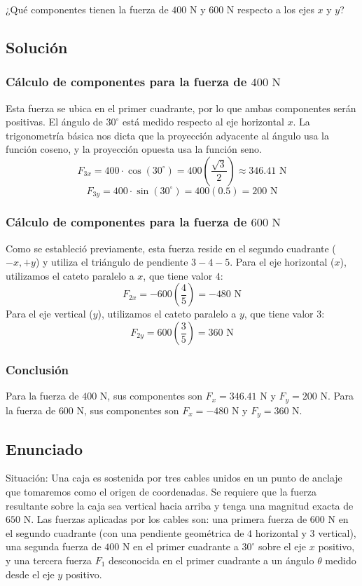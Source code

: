 \documentclass[12pt, a4paper]{article}
\begin{document}
¿Qué componentes tienen la fuerza de $400 \text{ N}$ y $600 \text{ N}$ respecto a los ejes $x$ y $y$?

\subsection*{Solución}

\subsubsection*{Cálculo de componentes para la fuerza de $400 \text{ N}$}
Esta fuerza se ubica en el primer cuadrante, por lo que ambas componentes serán positivas. El ángulo de $30^\circ$ está medido respecto al eje horizontal $x$. La trigonometría básica nos dicta que la proyección adyacente al ángulo usa la función coseno, y la proyección opuesta usa la función seno.
$$F_{3x} = 400 \cdot \cos(30^\circ) = 400 \left(\frac{\sqrt{3}}{2}\right) \approx 346.41 \text{ N}$$
$$F_{3y} = 400 \cdot \sin(30^\circ) = 400 (0.5) = 200 \text{ N}$$

\subsubsection*{Cálculo de componentes para la fuerza de $600 \text{ N}$}
Como se estableció previamente, esta fuerza reside en el segundo cuadrante ($-x, +y$) y utiliza el triángulo de pendiente $3-4-5$. 
Para el eje horizontal ($x$), utilizamos el cateto paralelo a $x$, que tiene valor $4$:
$$F_{2x} = -600 \left(\frac{4}{5}\right) = -480 \text{ N}$$
Para el eje vertical ($y$), utilizamos el cateto paralelo a $y$, que tiene valor $3$:
$$F_{2y} = 600 \left(\frac{3}{5}\right) = 360 \text{ N}$$

\subsubsection*{Conclusión}
Para la fuerza de $400 \text{ N}$, sus componentes son $F_x = 346.41 \text{ N}$ y $F_y = 200 \text{ N}$. 
Para la fuerza de $600 \text{ N}$, sus componentes son $F_x = -480 \text{ N}$ y $F_y = 360 \text{ N}$.

\newpage
\subsection*{Enunciado}
Situación: Una caja es sostenida por tres cables unidos en un punto de anclaje que tomaremos como el origen de coordenadas. Se requiere que la fuerza resultante sobre la caja sea vertical hacia arriba y tenga una magnitud exacta de $650 \text{ N}$. Las fuerzas aplicadas por los cables son: una primera fuerza de $600 \text{ N}$ en el segundo cuadrante (con una pendiente geométrica de $4$ horizontal y $3$ vertical), una segunda fuerza de $400 \text{ N}$ en el primer cuadrante a $30^\circ$ sobre el eje $x$ positivo, y una tercera fuerza $F_1$ desconocida en el primer cuadrante a un ángulo $\theta$ medido desde el eje $y$ positivo.
\end{document}
